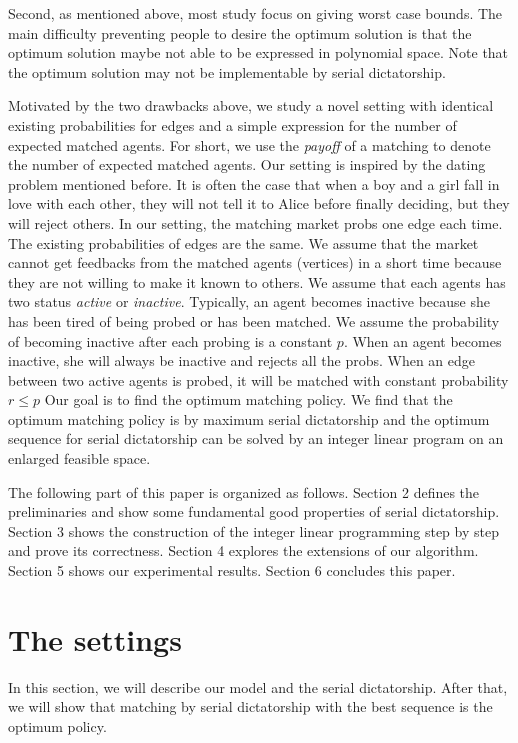 \documentclass[letterpaper]{article}
\begin{document}
Second, as mentioned above, most study focus on giving worst case bounds. 
The main difficulty preventing people to desire the optimum solution is that the optimum solution maybe not able to be expressed in polynomial space.
Note that the optimum solution may not be implementable by serial dictatorship. 

Motivated by the two drawbacks above, we study a novel setting with identical existing probabilities for edges and a simple expression for the number of expected matched agents.
For short, we use the \textit{payoff} of a matching to denote the number of expected matched agents.
Our setting is inspired by the dating problem mentioned before.
It is often the case that when a boy and a girl fall in love with each other, they will not tell it to Alice before finally deciding, but they will reject others.
In our setting, the matching market probs one edge each time.
The existing probabilities of edges are the same.
We assume that the market cannot get feedbacks from the matched agents (vertices) in a short time because they are not willing to make it known to others.
We assume that each agents has two status \textit{active} or \textit{inactive}.
Typically, an agent becomes inactive because she has been tired of being probed or has been matched.
We assume the probability of becoming inactive after each probing is a constant $p$.
When an agent becomes inactive, she will always be inactive and rejects all the probs. 
When an edge between two active agents is probed, it will be matched with constant probability $r\leq p$
Our goal is to find the optimum matching policy.
We find that the optimum matching policy is by maximum serial dictatorship and the optimum sequence for serial dictatorship can be solved by an integer linear program on an enlarged feasible space.


The following part of this paper is organized as follows. Section 2 defines the preliminaries and show some fundamental good properties of serial dictatorship. Section 3 shows the construction of the integer linear programming step by step and prove its correctness. Section 4 explores the extensions of our algorithm. Section 5 shows our experimental results. Section 6 concludes this paper.


\section{The settings}

In this section, we will describe our model and the serial dictatorship. After that, we will show that matching by serial dictatorship with the best sequence is the optimum policy.
\end{document}
